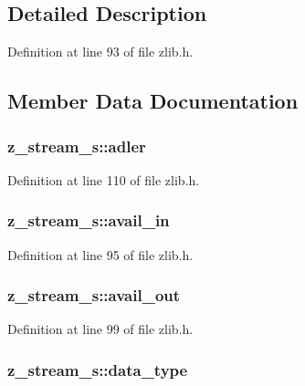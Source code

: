 \subsection{Detailed Description}


Definition at line 93 of file zlib.\-h.



\subsection{Member Data Documentation}
\hypertarget{structz__stream__s_ade2217fe31e671be1257731883201223}{
\subsubsection[{adler}]{ z\-\_\-stream\-\_\-s\-::adler}}\label{structz__stream__s_ade2217fe31e671be1257731883201223}


Definition at line 110 of file zlib.\-h.

\hypertarget{structz__stream__s_a0cf177f50dbb49692f27480cbcfde794}{
\subsubsection[{avail\-\_\-in}]{ z\-\_\-stream\-\_\-s\-::avail\-\_\-in}}\label{structz__stream__s_a0cf177f50dbb49692f27480cbcfde794}


Definition at line 95 of file zlib.\-h.

\hypertarget{structz__stream__s_a45ad2364307af9d944fd39d4eca3ca3c}{
\subsubsection[{avail\-\_\-out}]{ z\-\_\-stream\-\_\-s\-::avail\-\_\-out}}\label{structz__stream__s_a45ad2364307af9d944fd39d4eca3ca3c}


Definition at line 99 of file zlib.\-h.

\hypertarget{structz__stream__s_a9d8f63877d7639a8bca60f9fc3704fc4}{
\subsubsection[{data\-\_\-type}]{ z\-\_\-stream\-\_\-s\-::data\-\_\-type}}\label{structz__stream__s_a9d8f63877d7639a8bca60f9fc3704fc4}


